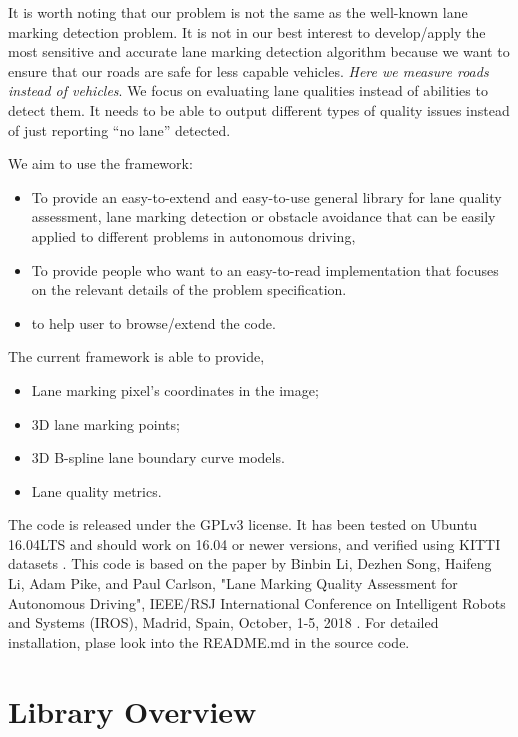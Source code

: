 \documentclass[a4paper]{article}
\begin{document}
It is worth noting that our problem is not the same as the well-known lane marking detection problem. It is not in our best interest to develop/apply the most sensitive and accurate lane marking detection algorithm because we want to ensure that our roads are safe for less capable vehicles. \emph{Here we measure roads instead of vehicles}. We focus on evaluating lane qualities instead of abilities to detect them. It needs to be able to output different types of quality issues instead of just reporting ``no lane'' detected. 


We aim to use the framework:
\begin{itemize}
\item To provide an easy-to-extend and easy-to-use general library for lane quality assessment, lane marking detection or obstacle avoidance that can be easily applied to different problems in autonomous driving,
\item To provide people who want to an  easy-to-read implementation that focuses on the relevant details of the problem specification.
\item to help user to browse/extend the code. 
\end{itemize}

The current framework is able to provide,
\begin{itemize}
	\item Lane marking pixel's coordinates in the image;
	\item 3D lane marking points;
	\item 3D B-spline lane boundary curve models. 
	\item Lane quality metrics.
\end{itemize}

The code is released under the GPLv3 license. It has been tested on Ubuntu 16.04LTS and should work on 16.04 or newer versions, and verified using KITTI datasets \cite{geiger2013vision}. 
This code is based on the paper by 
Binbin Li, Dezhen Song, Haifeng Li, Adam Pike, and Paul Carlson, "Lane Marking Quality Assessment for Autonomous Driving", IEEE/RSJ International Conference on Intelligent Robots and Systems (IROS), Madrid, Spain, October, 1-5, 2018 \cite{fumagalli2012modeling}. 
For detailed installation, plase look into the README.md in the source code. 

\section{Library Overview}
\end{document}
